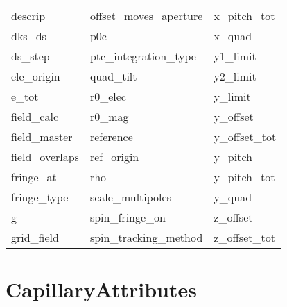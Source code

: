 \begin{tabular}{lll}
descrip                     & offset_moves_aperture       & x_pitch_tot                 \\
dks_ds                      & p0c                         & x_quad                      \\
ds_step                     & ptc_integration_type        & y1_limit                    \\
ele_origin                  & quad_tilt                   & y2_limit                    \\
e_tot                       & r0_elec                     & y_limit                     \\
field_calc                  & r0_mag                      & y_offset                    \\
field_master                & reference                   & y_offset_tot                \\
field_overlaps              & ref_origin                  & y_pitch                     \\
fringe_at                   & rho                         & y_pitch_tot                 \\
fringe_type                 & scale_multipoles            & y_quad                      \\
g                           & spin_fringe_on              & z_offset                    \\
grid_field                  & spin_tracking_method        & z_offset_tot                \\
 \bottomrule
 \end{tabular}
 \vfill
 
 \section{CapillaryAttributes}
 \label{s:list.capillary}
 
